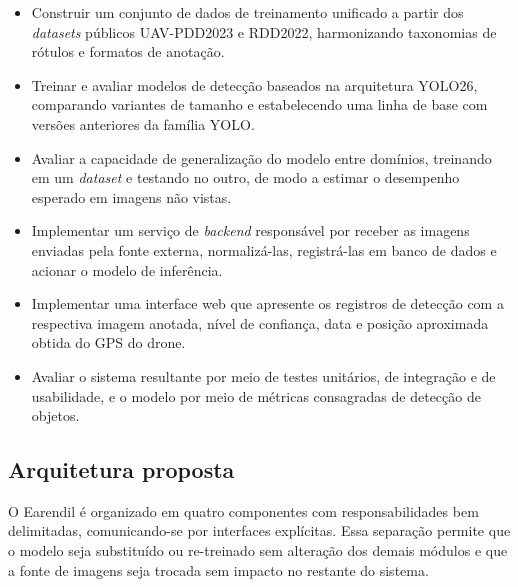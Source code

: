 \documentclass[12pt]{article}
\begin{document}
\begin{itemize}
  \item Construir um conjunto de dados de treinamento unificado a partir
    dos \emph{datasets} públicos UAV-PDD2023 e RDD2022, harmonizando
    taxonomias de rótulos e formatos de anotação.
  \item Treinar e avaliar modelos de detecção baseados na arquitetura
    YOLO26, comparando variantes de tamanho e estabelecendo uma linha de
    base com versões anteriores da família YOLO.
  \item Avaliar a capacidade de generalização do modelo entre domínios,
    treinando em um \emph{dataset} e testando no outro, de modo a estimar
    o desempenho esperado em imagens não vistas.
  \item Implementar um serviço de \emph{backend} responsável por receber
    as imagens enviadas pela fonte externa, normalizá-las, registrá-las
    em banco de dados e acionar o modelo de inferência.
  \item Implementar uma interface web que apresente os registros de
    detecção com a respectiva imagem anotada, nível de confiança, data e
    posição aproximada obtida do GPS do drone.
  \item Avaliar o sistema resultante por meio de testes unitários, de
    integração e de usabilidade, e o modelo por meio de métricas
    consagradas de detecção de objetos.
\end{itemize}

\subsection{Arquitetura proposta}
\label{sec:arquitetura}

O Earendil é organizado em quatro componentes com responsabilidades bem
delimitadas, comunicando-se por interfaces explícitas. Essa separação
permite que o modelo seja substituído ou re-treinado sem alteração dos
demais módulos e que a fonte de imagens seja trocada sem impacto no
restante do sistema.
\end{document}
